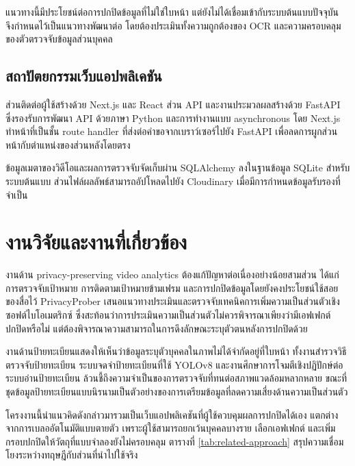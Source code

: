 แนวทางนี้มีประโยชน์ต่อการปกปิดข้อมูลที่ไม่ใช่ใบหน้า แต่ยังไม่ได้เชื่อมเข้ากับระบบต้นแบบปัจจุบัน จึงกำหนดไว้เป็นแนวทางพัฒนาต่อ โดยต้องประเมินทั้งความถูกต้องของ OCR และความครอบคลุมของตัวตรวจจับข้อมูลส่วนบุคคล

\subsection{สถาปัตยกรรมเว็บแอปพลิเคชัน}

ส่วนติดต่อผู้ใช้สร้างด้วย Next.js และ React ส่วน API และงานประมวลผลสร้างด้วย FastAPI ซึ่งรองรับการพัฒนา API ด้วยภาษา Python และการทำงานแบบ asynchronous โดย Next.js ทำหน้าที่เป็นชั้น route handler ที่ส่งต่อคำขอจากเบราว์เซอร์ไปยัง FastAPI เพื่อลดการผูกส่วนหน้ากับตำแหน่งของส่วนหลังโดยตรง \cite{fastapi}

ข้อมูลเมตาของวิดีโอและผลการตรวจจับจัดเก็บผ่าน SQLAlchemy ลงในฐานข้อมูล SQLite สำหรับระบบต้นแบบ ส่วนไฟล์ผลลัพธ์สามารถอัปโหลดไปยัง Cloudinary เมื่อมีการกำหนดข้อมูลรับรองที่จำเป็น

\section{งานวิจัยและงานที่เกี่ยวข้อง}

งานด้าน privacy-preserving video analytics ต้องแก้ปัญหาต่อเนื่องอย่างน้อยสามส่วน ได้แก่ การตรวจจับเป้าหมาย การติดตามเป้าหมายข้ามเฟรม และการปกปิดข้อมูลโดยยังคงประโยชน์ใช้สอยของสื่อไว้ PrivacyProber เสนอแนวทางประเมินและตรวจจับเทคนิคการเพิ่มความเป็นส่วนตัวเชิงซอฟต์ไบโอเมตริกซ์ ซึ่งสะท้อนว่าการประเมินความเป็นส่วนตัวไม่ควรพิจารณาเพียงว่ามีเอฟเฟกต์ปกปิดหรือไม่ แต่ต้องพิจารณาความสามารถในการดึงลักษณะระบุตัวตนหลังการปกปิดด้วย \cite{rot2022}

งานด้านป้ายทะเบียนแสดงให้เห็นว่าข้อมูลระบุตัวบุคคลในภาพไม่ได้จำกัดอยู่ที่ใบหน้า ทั้งงานสำรวจวิธีตรวจจับป้ายทะเบียน ระบบจดจำป้ายทะเบียนที่ใช้ YOLOv8 และงานศึกษาการโจมตีเชิงปฏิปักษ์ต่อระบบอ่านป้ายทะเบียน ล้วนชี้ถึงความจำเป็นของการตรวจจับที่ทนต่อสภาพแวดล้อมหลากหลาย ขณะที่ชุดข้อมูลป้ายทะเบียนแบบนิรนามเป็นตัวอย่างของการเตรียมข้อมูลที่ลดความเสี่ยงด้านความเป็นส่วนตัว \cite{iiieta_anpr,mdpi_anpr,vizcarra2024,anpr_dataset}

โครงงานนี้นำแนวคิดดังกล่าวมารวมเป็นเว็บแอปพลิเคชันที่ผู้ใช้ควบคุมผลการปกปิดได้เอง แตกต่างจากการเบลออัตโนมัติแบบตายตัว เพราะผู้ใช้สามารถยกเว้นบุคคลบางราย เลือกเอฟเฟกต์ และเพิ่มกรอบปกปิดให้วัตถุที่แบบจำลองยังไม่ครอบคลุม ตารางที่ \ref{tab:related-approach} สรุปความเชื่อมโยงระหว่างทฤษฎีกับส่วนที่นำไปใช้จริง

